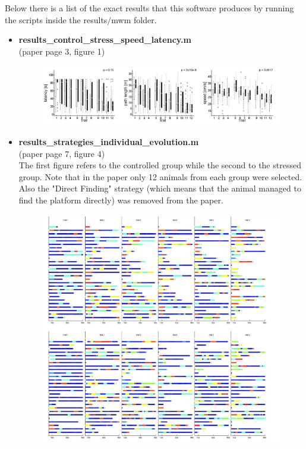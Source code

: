 \documentclass[12pt,titlepage]{article}
\begin{document}
\begin{doublespace}
Below there is a list of the exact results that this software produces by running the scripts inside the results$/$mwm folder.\\

\begin{itemize}
\item \textbf{results\_control\_stress\_speed\_latency.m}\\
(paper page 3, figure 1)
\begin{figure}[H]
	\begin{center}
		\includegraphics[width=1\textwidth]{f1.jpg}\\
		\label{code_fig1}
	\end{center}
\end{figure}
\item \textbf{results\_strategies\_individual\_evolution.m}\\
(paper page 7, figure 4)\\
The first figure refers to the controlled group while the second to the stressed group. Note that in the paper only 12 animals from each group were selected. Also the "Direct Finding" strategy (which means that the animal managed to find the platform directly) was removed from the paper.
\begin{figure}[H]
	\begin{center}
		\includegraphics[width=1\textwidth]{f4.jpg}\\

\end{center}
\end{figure}
\end{itemize}
\end{doublespace}
\end{document}
